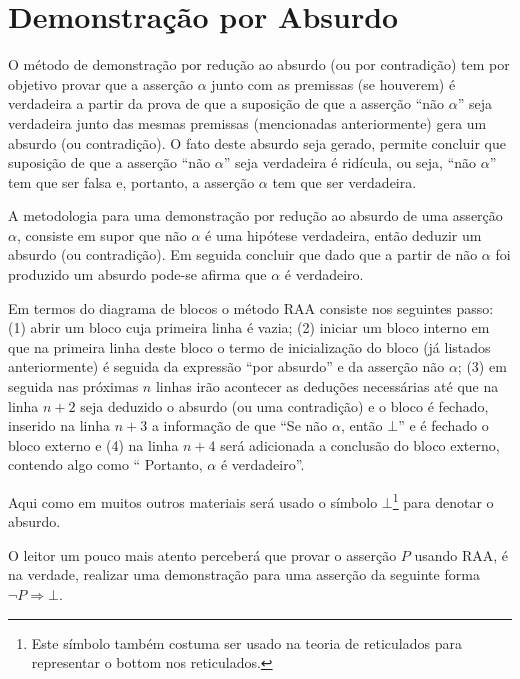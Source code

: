 \section{Demonstração por Absurdo}\label{sec:DemonstracaoAbsurdo}

O método de demonstração por redução ao absurdo (ou por contradição) tem por objetivo provar que a asserção $\alpha$ junto com as premissas (se houverem) é verdadeira a partir da prova de que a suposição de que a asserção ``não $\alpha$'' seja verdadeira junto das mesmas premissas (mencionadas anteriormente) gera um absurdo (ou contradição). O fato deste absurdo seja gerado, permite concluir que suposição de que a asserção ``não $\alpha$'' seja verdadeira é ridícula, ou seja, ``não $\alpha$'' tem que ser falsa e, portanto, a asserção $\alpha$ tem que ser verdadeira. 

\begin{definicao}
	A metodologia para uma demonstração por redução ao absurdo de uma asserção $\alpha$, consiste em supor que não $\alpha$ é uma hipótese verdadeira, então deduzir um absurdo (ou contradição). Em seguida concluir que dado que a partir de não $\alpha$ foi produzido um absurdo pode-se afirma que $\alpha$ é verdadeiro.
\end{definicao}

Em termos do diagrama de blocos o método RAA consiste nos seguintes passo: (1) abrir um bloco  cuja primeira linha é vazia; (2) iniciar um bloco interno em que na primeira linha deste bloco o termo de inicialização do bloco (já listados anteriormente) é seguida da expressão ``por absurdo'' e da asserção não $\alpha$; (3) em seguida nas próximas $n$ linhas irão acontecer as deduções necessárias até que na linha $n+2$ seja deduzido o absurdo (ou uma contradição) e o bloco é fechado, inserido na linha $n +3$ a informação de que ``Se não $\alpha$, então $\bot$'' e é fechado o bloco externo e (4) na linha $n + 4$ será adicionada a conclusão do bloco externo, contendo algo como `` Portanto, $\alpha$ é verdadeiro''.

\begin{atencao}
	Aqui como em muitos outros materiais será usado o símbolo $\bot$\footnote{Este símbolo também costuma ser usado na teoria de reticulados para representar o bottom nos reticulados.} para denotar o absurdo.
\end{atencao}

O leitor um pouco mais atento perceberá que provar o asserção $P$ usando RAA, é na verdade, realizar uma demonstração para uma asserção da seguinte forma $\neg P \Rightarrow \bot$.

